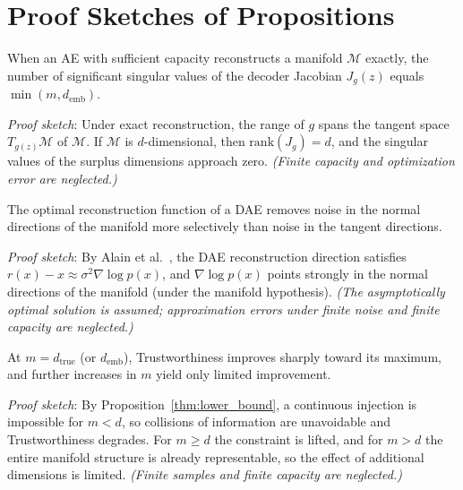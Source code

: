 \documentclass[make,article,submit,pdftex,moreauthors]{Definitions/mdpi}
\newcommand{\dtrue}{d_{\mathrm{true}}}
\newcommand{\Jg}{J_g}
\newcommand{\demb}{d_{\mathrm{emb}}}
\begin{document}
\appendixstart
\appendix

\section[\appendixname~\thesection]{Proof Sketches of Propositions}\label{app:proofs}

\begin{Proposition}\label{thm:rank}
When an AE with sufficient capacity reconstructs a manifold $\mathcal{M}$ exactly,
the number of significant singular values of the decoder Jacobian $\Jg(z)$ equals
$\min(m, \demb)$.
\end{Proposition}
\textit{Proof sketch}: Under exact reconstruction, the range of $g$ spans the
tangent space $T_{g(z)}\mathcal{M}$ of $\mathcal{M}$.
If $\mathcal{M}$ is $d$-dimensional, then $\mathrm{rank}(\Jg) = d$, and the
singular values of the surplus dimensions approach zero.
\textit{(Finite capacity and optimization error are neglected.)}

\begin{Proposition}\label{thm:nsr}
The optimal reconstruction function of a DAE removes noise in the normal
directions of the manifold more selectively than noise in the tangent directions.
\end{Proposition}
\textit{Proof sketch}: By Alain et al.~\cite{alain2014dae}, the DAE reconstruction
direction satisfies $r(x) - x \approx \sigma^2 \nabla\log p(x)$, and
$\nabla\log p(x)$ points strongly in the normal directions of the manifold
(under the manifold hypothesis).
\textit{(The asymptotically optimal solution is assumed; approximation errors
under finite noise and finite capacity are neglected.)}

\begin{Proposition}\label{thm:trust}
At $m = \dtrue$ (or $\demb$), Trustworthiness improves sharply toward its maximum,
and further increases in $m$ yield only limited improvement.
\end{Proposition}
\textit{Proof sketch}: By Proposition~\ref{thm:lower_bound}, a continuous injection
is impossible for $m < d$, so collisions of information are unavoidable and
Trustworthiness degrades.
For $m \geq d$ the constraint is lifted, and for $m > d$ the entire manifold
structure is already representable, so the effect of additional dimensions is
limited.
\textit{(Finite samples and finite capacity are neglected.)}
\end{document}
